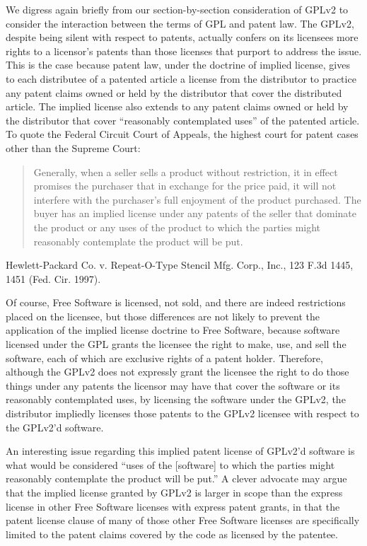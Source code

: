 We digress again briefly from our section-by-section consideration of GPLv2
to consider the interaction between the terms of GPL and patent law. The
GPLv2, despite being silent with respect to patents, actually confers on its
licensees more rights to a licensor's patents than those licenses that
purport to address the issue. This is the case because patent law, under
the doctrine of implied license, gives to each distributee of a patented
article a license from the distributor to practice any patent claims owned
or held by the distributor that cover the distributed article. The
implied license also extends to any patent claims owned or held by the
distributor that cover ``reasonably contemplated uses'' of the patented
article. To quote the Federal Circuit Court of Appeals, the highest court
for patent cases other than the Supreme Court:

\begin{quotation}
Generally, when a seller sells a product without restriction, it in
effect promises the purchaser that in exchange for the price paid, it will
not interfere with the purchaser's full enjoyment of the product
purchased. The buyer has an implied license under any patents of the
seller that dominate the product or any uses of the product to which the
parties might reasonably contemplate the product will be put.
\end{quotation}
Hewlett-Packard Co. v. Repeat-O-Type Stencil Mfg. Corp., Inc., 123 F.3d
1445, 1451 (Fed. Cir. 1997).

Of course, Free Software is licensed, not sold, and there are indeed
restrictions placed on the licensee, but those differences are not likely
to prevent the application of the implied license doctrine to Free
Software, because software licensed under the GPL grants the licensee the
right to make, use, and sell the software, each of which are exclusive
rights of a patent holder. Therefore, although the GPLv2 does not expressly
grant the licensee the right to do those things under any patents the
licensor may have that cover the software or its reasonably contemplated
uses, by licensing the software under the GPLv2, the distributor impliedly
licenses those patents to the GPLv2 licensee with respect to the GPLv2'd
software.

An interesting issue regarding this implied patent license of GPLv2'd
software is what would be considered ``uses of the [software] to which
the parties might reasonably contemplate the product will be put.'' A
clever advocate may argue that the implied license granted by GPLv2 is
larger in scope than the express license in other Free Software
licenses with express patent grants, in that the patent license
clause of many of those other Free  Software licenses are specifically 
limited to the patent claims covered by the code as licensed by the patentee.

